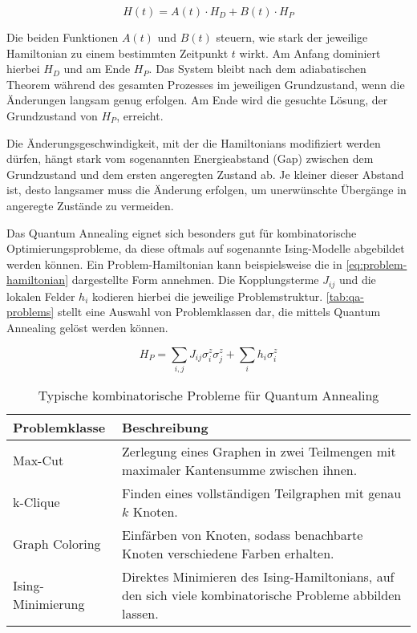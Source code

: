 \begin{equation}
    H(t) = A(t) \cdot H_D + B(t) \cdot H_P
\label{eq:time-dependent-hamiltonian}
\end{equation}

Die beiden Funktionen $A(t)$ und $B(t)$ steuern, wie stark der jeweilige Hamiltonian zu einem bestimmten Zeitpunkt $t$ wirkt. Am Anfang dominiert hierbei $H_D$ und am Ende $H_P$. Das System bleibt nach dem adiabatischen Theorem während des gesamten Prozesses im jeweiligen Grundzustand, wenn die Änderungen langsam genug erfolgen. Am Ende wird die gesuchte Lösung, der Grundzustand von $H_P$, erreicht.
 
Die Änderungsgeschwindigkeit, mit der die Hamiltonians modifiziert werden dürfen, hängt stark vom sogenannten Energieabstand (Gap) zwischen dem Grundzustand und dem ersten angeregten Zustand ab. Je kleiner dieser Abstand ist, desto langsamer muss die Änderung erfolgen, um unerwünschte Übergänge in angeregte Zustände zu vermeiden.

Das Quantum Annealing eignet sich besonders gut für kombinatorische Optimierungsprobleme, da diese oftmals auf sogenannte Ising-Modelle abgebildet werden können. Ein Problem-Hamiltonian kann beispielsweise die in \autoref{eq:problem-hamiltonian} dargestellte Form annehmen. Die Kopplungsterme $J_{ij}$ und die lokalen Felder $h_i$ kodieren hierbei die jeweilige Problemstruktur. \autoref{tab:qa-problems} stellt eine Auswahl von Problemklassen dar, die mittels Quantum Annealing gelöst werden können.

\begin{equation}
H_P = \sum_{i,j} J_{ij}\sigma_i^z\sigma_j^z + \sum_i h_i\sigma_i^z
\label{eq:problem-hamiltonian}
\end{equation}

\begin{table}[ht!]
\centering
\begin{tabularx}{\textwidth}{|l|X|}
\hline
\textbf{Problemklasse} & \textbf{Beschreibung} \\
\hline
Max-Cut & Zerlegung eines Graphen in zwei Teilmengen mit maximaler Kantensumme zwischen ihnen. \\
\hline
k-Clique & Finden eines vollständigen Teilgraphen mit genau \(k\) Knoten. \\
\hline
Graph Coloring & Einfärben von Knoten, sodass benachbarte Knoten verschiedene Farben erhalten. \\
\hline
Ising-Minimierung & Direktes Minimieren des Ising-Hamiltonians, auf den sich viele kombinatorische Probleme abbilden lassen. \\
\hline
\end{tabularx}
\caption{Typische kombinatorische Probleme für Quantum Annealing}
\label{tab:qa-problems}
\end{table}

